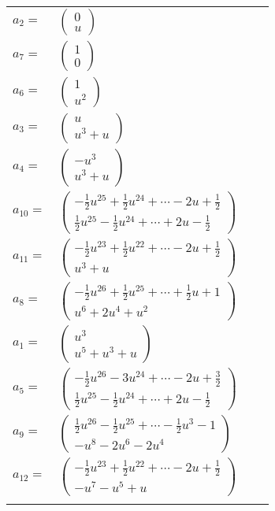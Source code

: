 \documentclass[1p]{elsarticle_modified}
\theoremstyle{definition}
\begin{document}
\begin{tabular}{m{7pt} m{180pt} m{7pt} m{180pt} }
\flushright $a_{2}=$&$\begin{pmatrix}0\\u\end{pmatrix}$ \\
\flushright $a_{7}=$&$\begin{pmatrix}1\\0\end{pmatrix}$ \\
\flushright $a_{6}=$&$\begin{pmatrix}1\\u^2\end{pmatrix}$ \\
\flushright $a_{3}=$&$\begin{pmatrix}u\\u^3+u\end{pmatrix}$ \\
\flushright $a_{4}=$&$\begin{pmatrix}- u^3\\u^3+u\end{pmatrix}$ \\
\flushright $a_{10}=$&$\begin{pmatrix}-\frac{1}{2} u^{25}+\frac{1}{2} u^{24}+\cdots-2 u+\frac{1}{2}\\\frac{1}{2} u^{25}-\frac{1}{2} u^{24}+\cdots+2 u-\frac{1}{2}\end{pmatrix}$ \\
\flushright $a_{11}=$&$\begin{pmatrix}-\frac{1}{2} u^{23}+\frac{1}{2} u^{22}+\cdots-2 u+\frac{1}{2}\\u^3+u\end{pmatrix}$ \\
\flushright $a_{8}=$&$\begin{pmatrix}-\frac{1}{2} u^{26}+\frac{1}{2} u^{25}+\cdots+\frac{1}{2} u+1\\u^6+2 u^4+u^2\end{pmatrix}$ \\
\flushright $a_{1}=$&$\begin{pmatrix}u^3\\u^5+u^3+u\end{pmatrix}$ \\
\flushright $a_{5}=$&$\begin{pmatrix}-\frac{1}{2} u^{26}-3 u^{24}+\cdots-2 u+\frac{3}{2}\\\frac{1}{2} u^{25}-\frac{1}{2} u^{24}+\cdots+2 u-\frac{1}{2}\end{pmatrix}$ \\
\flushright $a_{9}=$&$\begin{pmatrix}\frac{1}{2} u^{26}-\frac{1}{2} u^{25}+\cdots-\frac{1}{2} u^3-1\\- u^8-2 u^6-2 u^4\end{pmatrix}$ \\
\flushright $a_{12}=$&$\begin{pmatrix}-\frac{1}{2} u^{23}+\frac{1}{2} u^{22}+\cdots-2 u+\frac{1}{2}\\- u^7- u^5+u\end{pmatrix}$\\&\end{tabular}
\end{document}
